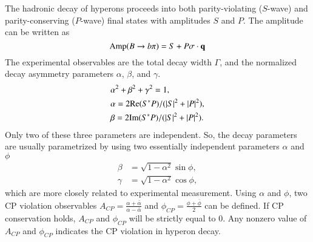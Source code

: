 The hadronic decay of hyperons proceeds into both parity-violating ($S$-wave) and 
parity-conserving ($P$-wave) final states with amplitudes $S$ and $P$. The amplitude can
be written as
\begin{equation}
	{\rm Amp}(B\to b\pi) = S + P {\bf \sigma} \cdot {\bf q}
\end{equation} 
The experimental observables are the total decay width $\Gamma$, and the normalized decay asymmetry 
parameters $\alpha$, $\beta$, and $\gamma$.
\begin{equation}
	\begin{aligned}
		&\alpha^2 + \beta^2 +\gamma^2 = 1, \\
		&\alpha = 2 {\rm Re} (S^*P) / (|S|^2 + |P|^2), \\
		&\beta = 2 {\rm Im} (S^*P) / (|S|^2 + |P|^2). \\
	\end{aligned}
\end{equation}
Only two of these three parameters are independent.
 So, the decay parameters are usually parametrized by using two 
 essentially independent parameters $\alpha$ and $\phi$
\begin{equation}
	\begin{aligned}
		\beta &= \sqrt{1-\alpha^2} \sin \phi,\\
		\gamma &= \sqrt{1-\alpha^2} \cos \phi,
	\end{aligned}
\end{equation}
which are more closely related to experimental measurement. Using $\alpha$
and $\phi$, two CP violation observables 
$A_{CP} = \frac{\alpha + \bar{\alpha}}{\alpha - \bar{\alpha}}$
and 
$\phi_{CP} = \frac{\phi + \bar{\phi}}{2}$ can be defined. 
If CP conservation holds, $A_{CP}$ and $\phi_{CP}$ will be strictly equal to 0.
Any nonzero value of $A_{CP}$ and $\phi_{CP}$ indicates the CP violation in
hyperon decay.

